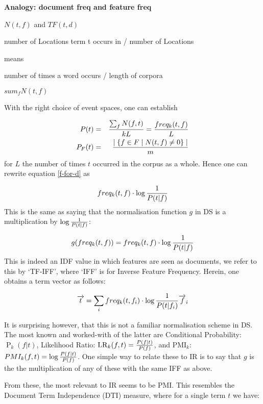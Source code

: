 {\bf Analogy: document  freq and  feature freq}

$N(t,f)$ and $TF(t,d)$




number of Locations term t occurs in / number of Locations

means

number of times a word occurs / length of corpora

$sum_f N(t,f)$

With the right choice of event spaces, one can establish

\begin{eqnarray}
P(t) &=&  {{\sum_f N(f,t)} \over {kL}} = {{freq_k(t,f)} \over {L}}\\
P_F (t) &=&  {{\mid \{f \in F \mid N(t,f)  \neq 0 \}\mid} \over {m}}
\end{eqnarray}
for $L$ the number of times $t$ occurred in the corpus as a whole.  Hence one can rewrite equation \ref{f-for-d} as

\begin{equation}
freq_k(t,f) \cdot \log{1 \over P(t|f)}
\end{equation}
This is the same as saying that  the normalisation function $g$ in DS is a multiplication by $ \log{1 \over P(t|f)}$:

\[
g(freq_k(t, f)) = freq_k(t,f) \cdot \log{1 \over P(t|f)}
\]
This  is indeed an IDF value in which features are seen as documents, we refer to this by `TF-IFF', where `IFF' is for Inverse Feature Frequency. Herein, one obtains a term vector as follows:

\begin{equation}
\label{vector-word-idf}
\overrightarrow{t}  = \sum_i  freq_k(t,f_i) \cdot \log{1 \over P(t|f_i)}  \overrightarrow{f}_i
\end{equation}


It is surprising however,   that this is not a familiar normalisation scheme in DS. The  most known and worked-with of the latter are  Conditional Probability: $\operatorname{P}_k(f|t)$,  Likelihood Ratio: $\operatorname{LR}_k(f,t) 
= {{P(f \mid t)} \over{P(f)}}$,  and PMI$_k$: $PMI_k (f, t) =  \log{{P(f \mid t)} \over{P(f)}}$.  One simple way to relate these to IR is to say that $g$ is the the multiplication of any of these with the same  IFF as above. 


From these,  the most relevant to IR seems to be PMI. This resembles the Document Term Independence (DTI) measure, where  for a single term $t$ we have:

